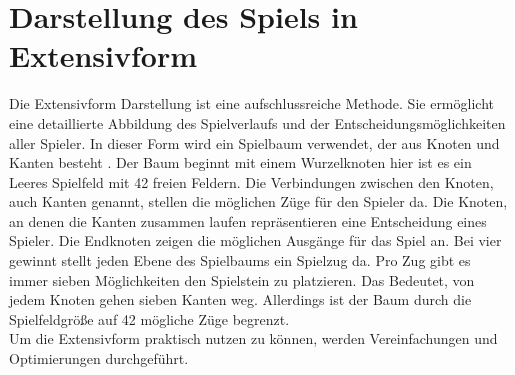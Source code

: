  \section{Darstellung des Spiels in Extensivform}
%
%


Die Extensivform Darstellung ist eine aufschlussreiche Methode.
Sie ermöglicht eine detaillierte Abbildung des Spielverlaufs und der Entscheidungsmöglichkeiten aller Spieler.
In dieser Form wird ein Spielbaum verwendet, der aus Knoten und Kanten besteht \autocite{einsiedler2014spieltheorie}. 
Der Baum beginnt mit einem Wurzelknoten hier ist es ein Leeres Spielfeld mit 42 freien Feldern. Die Verbindungen zwischen den Knoten, auch Kanten genannt, stellen die möglichen Züge für den Spieler da. Die Knoten, an denen die Kanten zusammen laufen repräsentieren eine Entscheidung eines Spieler. Die Endknoten zeigen die möglichen Ausgänge für das Spiel an.
Bei vier gewinnt stellt jeden Ebene des Spielbaums ein Spielzug da. Pro Zug gibt es immer sieben Möglichkeiten den Spielstein zu platzieren. Das Bedeutet, von jedem Knoten gehen sieben Kanten weg. Allerdings ist der Baum durch die Spielfeldgröße auf 42 mögliche Züge begrenzt.\\
Um die Extensivform praktisch nutzen zu können, werden Vereinfachungen und Optimierungen durchgeführt.

